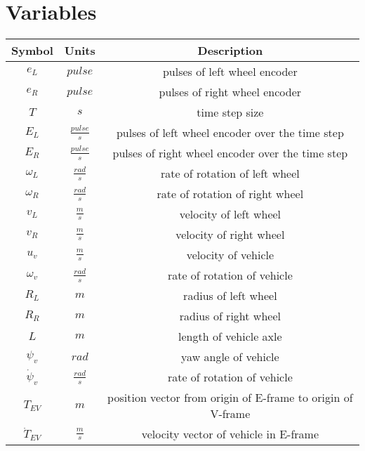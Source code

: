 \documentclass[12pt]{article}
\begin{document}
	\section{Variables}
		\begin{table}[hbt]
			\begin{center}
				\begin{tabular}{|c|c|c|}
					\hline
					Symbol & Units & Description \\ \hline
					$e_L$ & $pulse$ & pulses of left wheel encoder\\
					$e_R$ & $pulse$ & pulses of right wheel encoder\\
					$T$ & $s$ & time step size\\
					$E_L$ & $\frac{pulse}{s}$ & pulses of left wheel encoder over the time step \\
					$E_R$ & $\frac{pulse}{s}$ & pulses of right wheel encoder over the time step \\
					$\omega_L$ & $\frac{rad}{s}$ &rate of rotation of left wheel \\
					$\omega_R$ & $\frac{rad}{s}$ & rate of rotation of right wheel \\
					$v_L$ & $\frac{m}{s}$ & velocity of left wheel \\
					$v_R$ & $\frac{m}{s}$ & velocity of right wheel \\
					$u_v$ & $\frac{m}{s}$ & velocity of vehicle \\
					$\omega_v$ & $\frac{rad}{s}$ & rate of rotation of vehicle \\
					$R_L$ & $m$ & radius of left wheel\\
					$R_R$ & $m$ & radius of right wheel\\
					$L$ & $m$ & length of vehicle axle\\
					$\psi_v$ & $rad$ & yaw angle of vehicle\\
					$\dot{\psi}_v$ & $\frac{rad}{s}$ & rate of rotation of vehicle \\ 
					$T_{EV}$ & $m$ & position vector from origin of E-frame to origin of V-frame\\
					$\dot{T}_{EV}$ & $\frac{m}{s}$ & velocity vector of vehicle in E-frame 
				\\ \hline
			\end{tabular}
			\end{center}
		\end{table}
\end{document}
